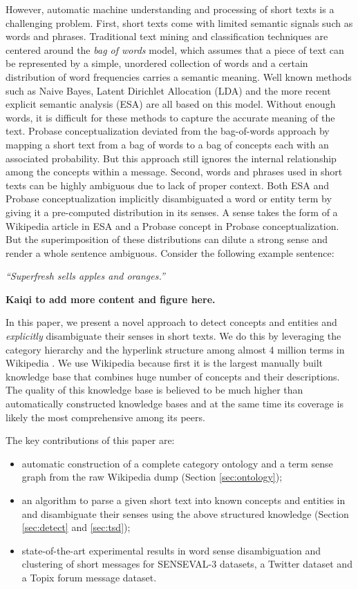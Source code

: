 However, automatic machine understanding and processing of short texts is
a challenging problem. First, short texts come with limited semantic 
signals such as words and phrases. 
Traditional text mining and classification techniques are centered around 
the {\em bag of words} model, which assumes that a piece of text can 
be represented by a simple, unordered collection of words and a
certain distribution of word frequencies carries a semantic meaning. Well
known methods such as Naive Bayes\cite{Lewis98:Naive}, 
Latent Dirichlet Allocation (LDA) \cite{BleiNJ03} and the more recent 
explicit semantic analysis (ESA) \cite{GabrilovichM07:ESA} 
are all based on this model. Without enough words, it is difficult for
these methods to capture the accurate meaning of the text.
Probase conceptualization \cite{Song11:Conceptualize} deviated from
the bag-of-words approach by mapping a short text from a bag of words 
to a bag of concepts each with an associated probability. But this approach
still ignores the internal relationship among the concepts within 
a message.
Second, words and phrases used in short texts can be highly ambiguous due to
lack of proper context. Both ESA and Probase conceptualization implicitly 
disambiguated a word or entity term by giving it a pre-computed 
distribution in its senses. A sense takes the form of a Wikipedia article
in ESA and a Probase concept in Probase conceptualization. But the 
superimposition of these distributions can dilute a strong sense and render
a whole sentence ambiguous. Consider the following example sentence:

{\em ``Superfresh sells apples and oranges.''}

{\bf Kaiqi to add more content and figure here.}

In this paper, we present a novel approach to detect concepts
and entities and {\em explicitly} disambiguate their senses in short texts.
We do this by leveraging the category hierarchy and the
hyperlink structure among almost 4 million terms in Wikipedia \cite{wikipedia}. 
We use Wikipedia because first it is the largest manually built
knowledge base that combines huge number of concepts and their
descriptions. The quality of this knowledge base is believed to be
much higher than automatically constructed knowledge bases and
at the same time its coverage is likely the most comprehensive
among its peers.

The key contributions of this paper are:
\begin{itemize}
\item automatic construction of a complete category ontology and 
a term sense graph from the raw Wikipedia dump (Section \ref{sec:ontology});
\item an algorithm to parse a given short text into known concepts and 
entities in and disambiguate their senses using the above structured
knowledge (Section \ref{sec:detect} and \ref{sec:tsd}); 
\item state-of-the-art experimental results in word sense disambiguation
and clustering of short messages for SENSEVAL-3 datasets, 
a Twitter dataset and a Topix forum message dataset.
\end{itemize}

